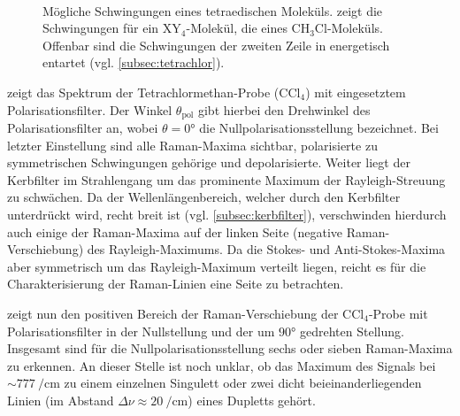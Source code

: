 \documentclass[../bericht.tex]{subfiles}
\begin{document}
        \begin{figure}[p]
          \centering
            \\
          \caption[Mögliche Schwingungen eines tetraedischen Moleküls.]{Mögliche Schwingungen eines tetraedischen Moleküls. \protect{} zeigt die Schwingungen für ein $\mathrm{XY_4}$-Molekül, \protect{} die eines $\mathrm{CH_3Cl}$-Moleküls. Offenbar sind die Schwingungen der zweiten Zeile in \protect{} energetisch entartet (vgl. \cref{subsec:tetrachlor}). \cite{herzberg}}
          \label{fig:schwingungen}
        \end{figure}

         zeigt das Spektrum der Tetrachlormethan-Probe ($\mathrm{CCl_4}$) mit eingesetztem Polarisationsfilter. Der Winkel $\theta_\mathrm{pol}$ gibt hierbei den Drehwinkel des Polarisationsfilter an, wobei $\theta=\ang{0}$ die Nullpolarisationsstellung bezeichnet. Bei letzter Einstellung sind alle Raman-Maxima sichtbar, polarisierte zu symmetrischen Schwingungen gehörige und depolarisierte. Weiter liegt der Kerbfilter im Strahlengang um das prominente Maximum der Rayleigh-Streuung zu schwächen. Da der Wellenlängenbereich, welcher durch den Kerbfilter unterdrückt wird, recht breit ist (vgl. \cref{subsec:kerbfilter}), verschwinden hierdurch auch einige der Raman-Maxima auf der linken Seite (negative Raman-Verschiebung) des Rayleigh-Maximums. Da die Stokes- und Anti-Stokes-Maxima aber symmetrisch um das Rayleigh-Maximum verteilt liegen, reicht es für die Charakterisierung der Raman-Linien eine Seite zu betrachten.
        \medskip

         zeigt nun den positiven Bereich der Raman-Verschiebung der $\mathrm{CCl_4}$-Probe mit Polarisationsfilter in der Nullstellung und der um $\ang{90}$ gedrehten Stellung. Insgesamt sind für die Nullpolarisationsstellung sechs oder sieben Raman-Maxima zu erkennen. An dieser Stelle ist noch unklar, ob das Maximum des Signals bei $\sim \SI{777}{\per\centi\meter}$ zu einem einzelnen Singulett oder zwei dicht beieinanderliegenden Linien (im Abstand $\Delta \nu \approx \SI{20}{\per\centi\meter}$) eines Dupletts gehört.
\end{document}
